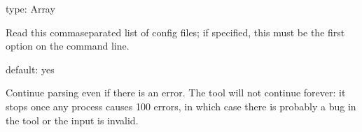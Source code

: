 \documentclass[letterpaper,10pt,english]{sphinxmanual}
\begin{document}

\begin{fulllineitems}
\label{\detokenize{mariadb-query-digest:cmdoption-mariadb-query-digest-config}}
\sphinxAtStartPar
type: Array

\sphinxAtStartPar
Read this comma\sphinxhyphen{}separated list of config files; if specified, this must be the
first option on the command line.

\end{fulllineitems}


\begin{fulllineitems}
\label{\detokenize{mariadb-query-digest:cmdoption-mariadb-query-digest-no-continue-on-error}}
\sphinxAtStartPar
default: yes

\sphinxAtStartPar
Continue parsing even if there is an error.  The tool will not continue
forever: it stops once any process causes 100 errors, in which case there
is probably a bug in the tool or the input is invalid.

\end{fulllineitems}
\end{document}
